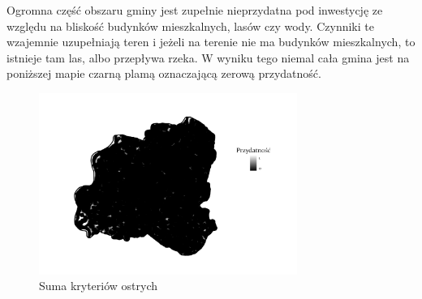 \documentclass{article}
\begin{document}
Ogromna część obszaru gminy jest zupełnie nieprzydatna pod inwestycję ze względu na bliskość budynków mieszkalnych, lasów czy wody. Czynniki te wzajemnie uzupełniają teren i jeżeli na terenie nie ma budynków mieszkalnych, to istnieje tam las, albo przepływa rzeka. W wyniku tego niemal cała gmina jest na poniższej mapie czarną plamą oznaczającą zerową przydatność.

\begin{figure}[H]
    \centering
    \includegraphics[width=0.75\textwidth]{img/plesna-ostre-layout.jpg}
    \caption{Suma kryteriów ostrych}
    \label{fig:ostre-plesna}
\end{figure}
\end{document}
